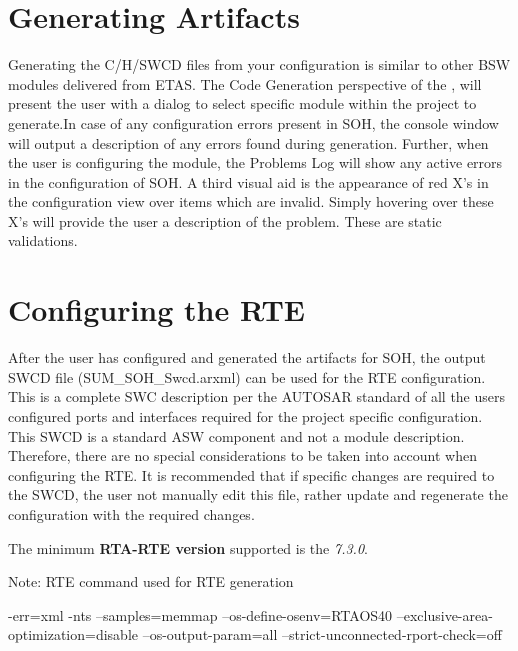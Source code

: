 \section{Generating Artifacts}
Generating the C/H/SWCD files from your configuration is similar to other BSW modules delivered
from ETAS. The Code Generation perspective of the \ifnum {}\fi, will present the user with a dialog
to select specific module within the project to generate.\ifnum {}\fi In case of any configuration errors present in SOH, the
console window will output a description of any errors found during generation. Further, when the
user is configuring the module, the Problems Log will show any active errors in the configuration of
SOH. A third visual aid is the appearance of red X’s in the configuration view over items which are invalid. 
Simply hovering over these X’s will provide the user a description of the problem. These are static validations.

\section{Configuring the RTE}
\label{sec:rte}
After the user has configured and generated the artifacts for SOH, the output SWCD file\newline
(SUM\_SOH\_Swcd.arxml) can be used for the RTE configuration. This is a complete SWC description
per the AUTOSAR standard of all the users configured ports and interfaces required for the project
specific configuration. This SWCD is a standard ASW component and not a module description. Therefore,
there are no special considerations to be taken into account when configuring the RTE. It is
recommended that if specific changes are required to the SWCD, the user not manually edit this file,
rather update and regenerate the configuration with the required changes.


The minimum \textbf{RTA-RTE version} supported is the \textit{7.3.0}.


Note: RTE command used for RTE generation

\begin{rtecommandline}
-err=xml -nts --samples=memmap --os-define-osenv=RTAOS40 --exclusive-area-optimization=disable --os-output-param=all --strict-unconnected-rport-check=off
\end{rtecommandline}

